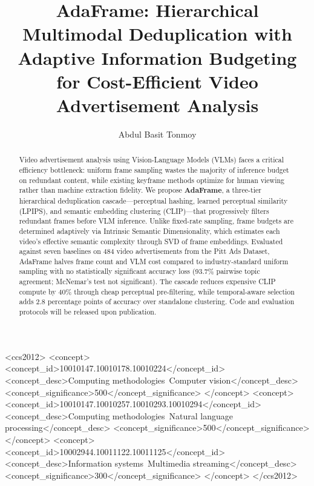 \documentclass[sigconf,nonacm]{acmart}
\begin{document}
\title[AdaFrame: Adaptive Video Ad Analysis]{AdaFrame: Hierarchical Multimodal Deduplication with Adaptive Information Budgeting for Cost-Efficient Video Advertisement Analysis}

\author{Abdul Basit Tonmoy}

\begin{abstract}
Video advertisement analysis using Vision-Language Models (VLMs) faces a critical efficiency bottleneck: uniform frame sampling wastes the majority of inference budget on redundant content, while existing keyframe methods optimize for human viewing rather than machine extraction fidelity. We propose \textbf{AdaFrame}, a three-tier hierarchical deduplication cascade---perceptual hashing, learned perceptual similarity (LPIPS), and semantic embedding clustering (CLIP)---that progressively filters redundant frames before VLM inference. Unlike fixed-rate sampling, frame budgets are determined adaptively via Intrinsic Semantic Dimensionality, which estimates each video's effective semantic complexity through SVD of frame embeddings. Evaluated against seven baselines on 484 video advertisements from the Pitt Ads Dataset, AdaFrame halves frame count and VLM cost compared to industry-standard uniform sampling with no statistically significant accuracy loss (93.7\% pairwise topic agreement; McNemar's test not significant). The cascade reduces expensive CLIP compute by 40\% through cheap perceptual pre-filtering, while temporal-aware selection adds 2.8 percentage points of accuracy over standalone clustering. Code and evaluation protocols will be released upon publication.
\end{abstract}

\begin{CCSXML}
<ccs2012>
  <concept>
    <concept_id>10010147.10010178.10010224</concept_id>
    <concept_desc>Computing methodologies~Computer vision</concept_desc>
    <concept_significance>500</concept_significance>
  </concept>
  <concept>
    <concept_id>10010147.10010257.10010293.10010294</concept_id>
    <concept_desc>Computing methodologies~Natural language processing</concept_desc>
    <concept_significance>500</concept_significance>
  </concept>
  <concept>
    <concept_id>10002944.10011122.10011125</concept_id>
    <concept_desc>Information systems~Multimedia streaming</concept_desc>
    <concept_significance>300</concept_significance>
  </concept>
</ccs2012>
\end{CCSXML}
\end{document}
